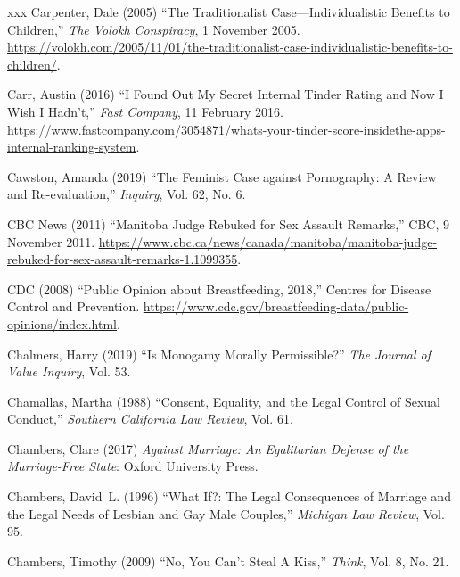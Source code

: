 \documentclass[]{jlreq} \usepackage{mystyle}
\begin{document}
\begin{thebibliography}{xxx}
Carpenter, Dale (2005) ``The Traditionalist Case---Individualistic Benefits to
  Children,'' \emph{The Volokh Conspiracy}, 1 November 2005.
  \url{https://volokh.com/2005/11/01/the-traditionalist-case-individualistic-benefits-to-children/}.

Carr, Austin (2016) ``I Found Out My Secret Internal Tinder Rating and Now I
  Wish I Hadn't,'' \emph{Fast Company}, 11 February 2016.
  \url{https://www.fastcompany.com/3054871/whats-your-tinder-score-insidethe-apps-internal-ranking-system}.

Cawston, Amanda (2019) ``The Feminist Case against Pornography: A Review and
  Re-evaluation,'' \textit{ Inquiry}, Vol. 62, No. 6.

{CBC News} (2011) ``Manitoba Judge Rebuked for Sex Assault Remarks,'' CBC, 9
  November 2011.
  \url{https://www.cbc.ca/news/canada/manitoba/manitoba-judge-rebuked-for-sex-assault-remarks-1.1099355}.

{CDC} (2008) ``Public Opinion about Breastfeeding, 2018,'' Centres for Disease
  Control and Prevention.
  \url{https://www.cdc.gov/breastfeeding-data/public-opinions/index.html}.

Chalmers, Harry (2019) ``Is Monogamy Morally Permissible?'' \textit{ The
  Journal of Value Inquiry}, Vol. 53.

Chamallas, Martha (1988) ``Consent, Equality, and the Legal Control of Sexual
  Conduct,'' \textit{ Southern California Law Review}, Vol. 61.

Chambers, Clare (2017)  \textit{ Against Marriage: An Egalitarian Defense of
  the Marriage-Free State}: Oxford University Press.

Chambers, David~L. (1996) ``What If?: The Legal Consequences of Marriage and
  the Legal Needs of Lesbian and Gay Male Couples,'' \textit{ Michigan Law
  Review}, Vol. 95.

Chambers, Timothy (2009) ``No, You Can't Steal A Kiss,'' \textit{ Think}, Vol.
  8, No. 21.


\end{thebibliography}
\end{document}
